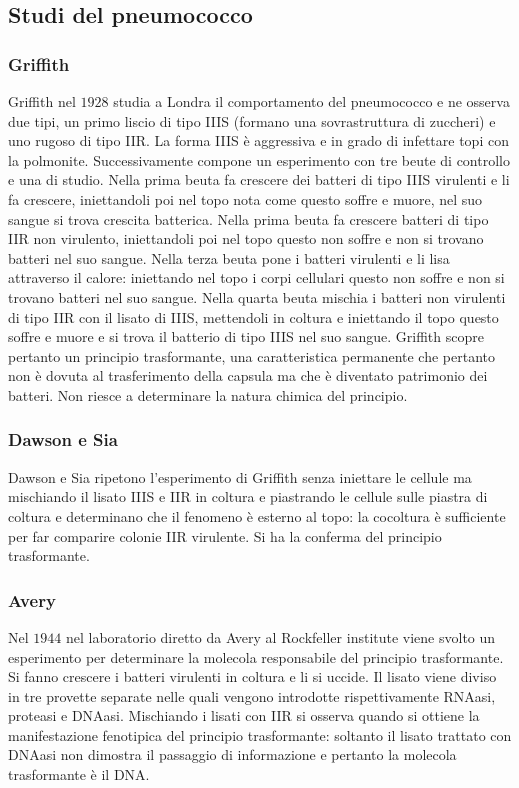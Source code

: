 \subsection{Studi del pneumococco}
\subsubsection{Griffith}
Griffith nel $1928$ studia a Londra il comportamento del pneumococco e ne osserva due tipi, un primo liscio di tipo IIIS (formano una sovrastruttura di zuccheri) e uno rugoso di tipo 
IIR. La forma IIIS \`e aggressiva e in grado di infettare topi con la polmonite. Successivamente compone un esperimento con tre beute di controllo e una di studio. Nella prima beuta
fa crescere dei batteri di tipo IIIS virulenti e li fa crescere, iniettandoli poi nel topo nota come questo soffre e muore, nel suo sangue si trova crescita batterica. Nella prima 
beuta fa crescere batteri di tipo IIR non virulento, iniettandoli poi nel topo questo non soffre e non si trovano batteri nel suo sangue. Nella terza beuta pone i batteri virulenti e
li lisa attraverso il calore: iniettando nel topo i corpi cellulari questo non soffre e non si trovano batteri nel suo sangue. Nella quarta beuta mischia i batteri non virulenti di 
tipo IIR con il lisato di IIIS, mettendoli in coltura e iniettando il topo questo soffre e muore e si trova il batterio di tipo IIIS nel suo sangue. Griffith scopre pertanto un 
principio trasformante, una caratteristica permanente che pertanto non \`e dovuta al trasferimento della capsula ma che \`e diventato patrimonio dei batteri. Non riesce a determinare
la natura chimica del principio.
\subsubsection{Dawson e Sia}
Dawson e Sia ripetono l'esperimento di Griffith senza iniettare le cellule ma mischiando il lisato IIIS e IIR in coltura e piastrando le cellule sulle piastra di coltura e determinano
che il fenomeno \`e esterno al topo: la cocoltura \`e sufficiente per far comparire colonie IIR virulente. Si ha la conferma del principio trasformante. 
\subsubsection{Avery}
Nel $1944$ nel laboratorio diretto da Avery al Rockfeller institute viene svolto un esperimento per determinare la molecola responsabile del principio trasformante. Si fanno crescere
i batteri virulenti in coltura e li si uccide. Il lisato viene diviso in tre provette separate nelle quali vengono introdotte rispettivamente RNAasi, proteasi e DNAasi. Mischiando 
i lisati con IIR si osserva quando si ottiene la manifestazione fenotipica del principio trasformante: soltanto il lisato trattato con DNAasi non dimostra il passaggio di informazione
e pertanto la molecola trasformante \`e il DNA. 

